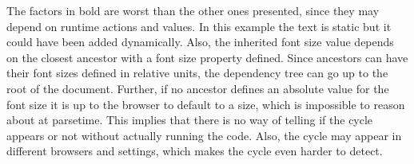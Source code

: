 \documentclass[a4paper,11pt]{kth-mag}
\newcommand{\code}[1]{\texttt{#1}}
\begin{document}
        The factors in bold are worst than the other ones presented, since they may depend on runtime actions and values.
        In this example the text is static but it could have been added dynamically.
        Also, the inherited font size value depends on the closest ancestor with a font size property defined.
        Since ancestors can have their font sizes defined in relative units, the dependency tree can go up to the root of the \gls{document}.
        Further, if no ancestor defines an absolute value for the font size it is up to the \gls{browser} to default to a size, which is impossible to reason about at parsetime.
        This implies that there is no way of telling if the cycle appears or not without actually running the code.
        Also, the cycle may appear in different \glspl{browser} and settings, which makes the cycle even harder to detect.
        

\end{document}
